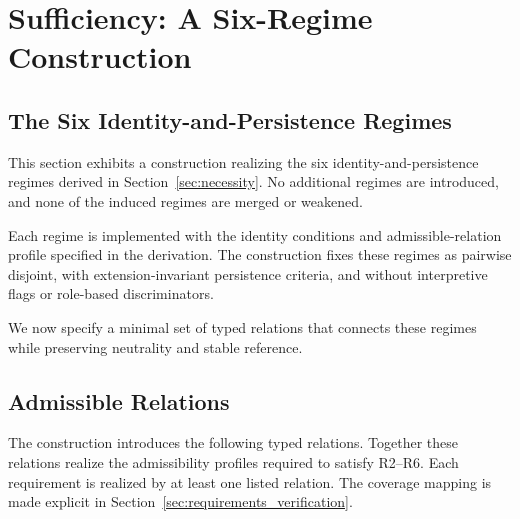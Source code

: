 \section{Sufficiency: A Six-Regime Construction}
\label{sec:sufficiency}

\subsection{The Six Identity-and-Persistence Regimes}

This section exhibits a construction realizing
the six identity-and-persistence regimes
derived in Section~\ref{sec:necessity}.
No additional regimes are introduced,
and none of the induced regimes are merged or weakened.

Each regime is implemented with the identity conditions
and admissible-relation profile specified in the derivation.
The construction fixes these regimes as pairwise disjoint,
with extension-invariant persistence criteria,
and without interpretive flags or role-based discriminators.

We now specify a minimal set of typed relations
that connects these regimes while preserving
neutrality and stable reference.

\subsection{Admissible Relations}

The construction introduces the following typed relations.
Together these relations realize the admissibility profiles
required to satisfy R2--R6.
Each requirement is realized by at least one listed relation.
The coverage mapping is made explicit in
Section~\ref{sec:requirements_verification}.

